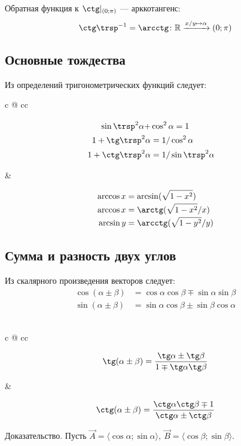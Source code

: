 Обратная функция к $\ctg\vert_{(0;\pi)}$ --- {\bold арккотангенс}:
$$\ctg\trsp^{-1}=\arcctg\colon\mathbb{R}\xrightarrow{x/y\mapsto\alpha}(0;\pi)$$

\subsection{Основные тождества}

Из определений тригонометрических функций следует:\par
\vspace*{-5pt}
\begin{tabularc}{0pt}{0pt}{c @{\quad\quad} c}{c}
\parbox{115pt}{\begin{align*}\\[-13.7pt]
\sin\trsp^2\alpha+&\cos^2\alpha=1\\[0.3pt]
1+\tg\trsp^2\alpha&=1/\cos^2\alpha\\[1pt]
1+\ctg\trsp^2\alpha&=1/\sin\trsp^2\alpha
\end{align*}} &
\parbox{158pt}{\begin{align*}
\arccos x&=\arcsin(\sqrt{1-x^2})\\[-2pt]
\arccos x&=\arctg(\sqrt{1-x^2}/x)\\[-2pt]
\arcsin y&=\arcctg(\sqrt{1-y^2}/y)
\end{align*}}
\end{tabularc}

\vspace*{-6pt}
\subsection{Сумма и разность двух углов}

Из скалярного произведения векторов следует:
\begin{align*}
\cos(\alpha\pm\beta)&=\cos\alpha\cos\beta\mp\sin\alpha\sin\beta\\
\sin(\alpha\pm\beta)&=\sin\alpha\cos\beta\pm\sin\beta\cos\alpha
\end{align*}\leavevmode\\[-10pt]
\begin{tabularc}{0pt}{0pt}{c @{\quad\quad} c}{c}
\parbox{144pt}{$$\tg(\alpha\pm\beta)=\frac{\tg\alpha\pm\tg\beta}{1\mp\tg\alpha\tg\beta}
$$} &
\parbox{150pt}{$$\ctg(\alpha\pm\beta)=\frac{\ctg\alpha\ctg\beta\mp 1}{\ctg\alpha\pm
\ctg\beta}$$}
\end{tabularc}
{\bold Доказательство.} Пусть $\vec{A}=\langle\cos\alpha;\sin\alpha\rangle,\ 
\vec{B}=\langle\cos\beta;\sin\beta\rangle$.\par


